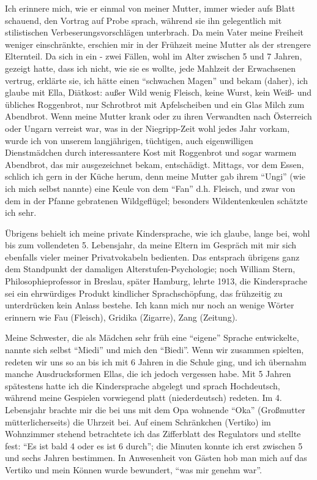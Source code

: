 \documentclass[a5paper,pagesize,10pt,twoside=true]{scrbook}
\begin{document}
Ich erinnere mich, wie er einmal von meiner Mutter, immer wieder aufs Blatt schauend, den Vortrag auf Probe sprach, während sie ihn gelegentlich mit stilistischen Verbeserungsvorschlägen unterbrach. Da mein Vater meine Freiheit weniger einschränkte, erschien mir in der Frühzeit meine Mutter als der strengere Elternteil. Da sich in ein - zwei Fällen, wohl im Alter zwischen 5 und 7 Jahren, gezeigt hatte, dass ich nicht, wie sie es wollte, jede Mahlzeit der Erwachsenen vertrug, erklärte sie, ich hätte einen \enquote{schwachen Magen} und bekam (daher), ich glaube mit Ella, Diätkost: außer Wild wenig Fleisch, keine Wurst, kein Weiß- und übliches Roggenbrot, nur Schrotbrot mit Apfelscheiben und ein Glas Milch zum Abendbrot. Wenn meine Mutter krank oder zu ihren Verwandten nach Österreich oder Ungarn verreist war, was in der Niegripp-Zeit wohl jedes Jahr vorkam, wurde ich von unserem langjährigen, tüchtigen, auch eigenwilligen Dienstmädchen durch interessantere Kost mit Roggenbrot und sogar warmem Abendbrot, das mir ausgezeichnet bekam, entschädigt. Mittags, vor dem Essen, schlich ich gern in der Küche herum, denn meine Mutter gab ihrem \enquote{Ungi} (wie ich mich selbst nannte) eine Keule von dem \enquote{Fan} d.h. Fleisch, und zwar von dem in der Pfanne gebratenen Wildgeflügel; besonders Wildentenkeulen schätzte ich sehr.

Übrigens behielt ich meine private Kindersprache, wie ich glaube, lange bei, wohl bis zum vollendeten 5. Lebensjahr, da meine Eltern im Gespräch mit mir sich ebenfalls vieler meiner Privatvokabeln bedienten. Das entsprach übrigens ganz dem Standpunkt der damaligen Alterstufen-Psychologie; noch William Stern, Philosophieprofessor in Breslau, später Hamburg, lehrte 1913, die Kindersprache sei ein ehrwürdiges Produkt kindlicher Sprachschöpfung, das frühzeitig zu unterdrücken kein Anlass bestehe. Ich kann mich nur noch an wenige Wörter erinnern wie Fau (Fleisch), Gridika (Zigarre), Zang (Zeitung).

Meine Schwester, die als Mädchen sehr früh eine \enquote{eigene} Sprache entwickelte, nannte sich selbst \enquote{Miedi} und mich den \enquote{Biedi}. Wenn wir zusammen spielten, redeten wir uns so an bis ich mit 6 Jahren in die Schule ging, und ich übernahm manche Ausdrucksformen Ellas, die ich jedoch vergessen habe. Mit 5 Jahren spätestens hatte ich die Kindersprache abgelegt und sprach Hochdeutsch, während meine Gespielen vorwiegend platt (niederdeutsch) redeten. Im 4. Lebensjahr brachte mir die bei uns mit dem Opa wohnende \enquote{Oka} (Großmutter mütterlicherseits) die Uhrzeit bei. Auf einem Schränkchen (Vertiko) im Wohnzimmer stehend betrachtete ich das Zifferblatt des Regulators und stellte fest: \enquote{Es ist bald 4 oder es ist 6 durch}; die Minuten konnte ich erst zwischen 5 und sechs Jahren bestimmen. In Anwesenheit von Gästen hob man mich auf das Vertiko und mein Können wurde bewundert, \enquote{was mir genehm war}.
\end{document}
